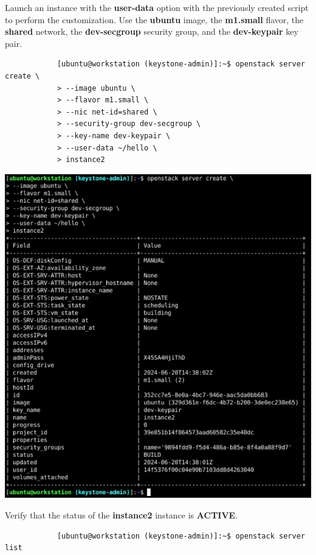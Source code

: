 \documentclass[letterpaper, 12pt]{article}
\begin{document}
\begin{enumerate}
    \begin{labstep}
        Launch an instance with the \textbf{user-data} option with the previously created script to perform the customization.
        Use the \textbf{ubuntu} image, the \textbf{m1.small} flavor, the \textbf{shared} network, the \textbf{dev-secgroup} security group, and the \textbf{dev-keypair} key pair.
        \begin{lstlisting}
            [ubuntu@workstation (keystone-admin)]:~$ openstack server create \
            > --image ubuntu \
            > --flavor m1.small \
            > --nic net-id=shared \
            > --security-group dev-secgroup \
            > --key-name dev-keypair \
            > --user-data ~/hello \
            > instance2
        \end{lstlisting}

        \begin{center}
            \includegraphics[width=\linewidth]{images/part3/step3.png}
        \end{center}
    \end{labstep}

    \begin{labstep}
        Verify that the status of the \textbf{instance2} instance is \textbf{ACTIVE}.
        \begin{lstlisting}
            [ubuntu@workstation (keystone-admin)]:~$ openstack server list
        \end{lstlisting}


\end{labstep}
\end{enumerate}
\end{document}
